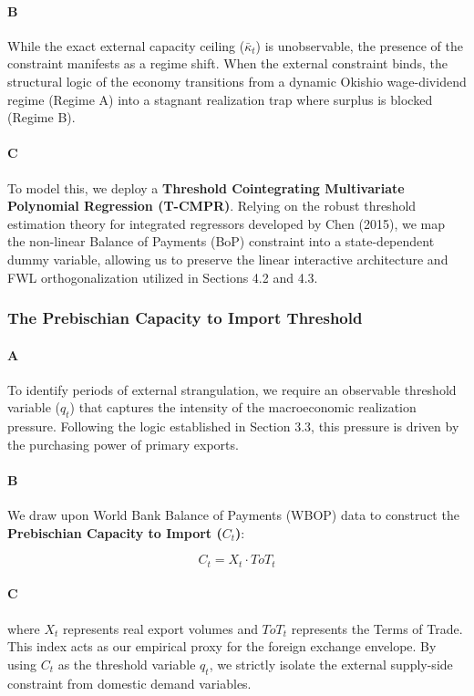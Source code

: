 \paragraph{B}
While the exact external capacity ceiling ($\bar{\kappa}_t$) is unobservable, the presence of the constraint manifests as a regime shift. When the external constraint binds, the structural logic of the economy transitions from a dynamic Okishio wage-dividend regime (Regime A) into a stagnant realization trap where surplus is blocked (Regime B).

\paragraph{C}
To model this, we deploy a \textbf{Threshold Cointegrating Multivariate Polynomial Regression (T-CMPR)}. Relying on the robust threshold estimation theory for integrated regressors developed by Chen (2015), we map the non-linear Balance of Payments (BoP) constraint into a state-dependent dummy variable, allowing us to preserve the linear interactive architecture and FWL orthogonalization utilized in Sections 4.2 and 4.3.

\subsubsection{The Prebischian Capacity to Import Threshold}

\paragraph{A}
To identify periods of external strangulation, we require an observable threshold variable ($q_t$) that captures the intensity of the macroeconomic realization pressure. Following the logic established in Section 3.3, this pressure is driven by the purchasing power of primary exports.

\paragraph{B}
We draw upon World Bank Balance of Payments (WBOP) data to construct the \textbf{Prebischian Capacity to Import ($C_t$)}:

\[ C_t = X_t \cdot ToT_t \]

\paragraph{C}
where $X_t$ represents real export volumes and $ToT_t$ represents the Terms of Trade. This index acts as our empirical proxy for the foreign exchange envelope. By using $C_t$ as the threshold variable $q_t$, we strictly isolate the external supply-side constraint from domestic demand variables.

